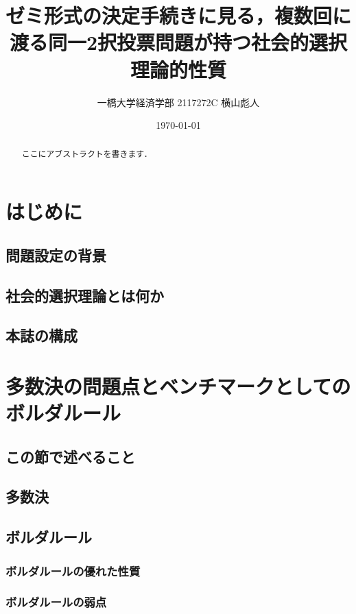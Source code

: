 \documentclass{jsarticle}
\begin{document}
\title{ゼミ形式の決定手続きに見る，複数回に渡る同一2択投票問題が持つ社会的選択理論的性質}
\author{一橋大学経済学部 2117272C 横山彪人}
\date{\today}
\maketitle

\begin{abstract}
  ここにアブストラクトを書きます．
\end{abstract}

\tableofcontents
\clearpage

\section{はじめに}
\subsection{問題設定の背景}
\subsection{社会的選択理論とは何か}
\subsection{本誌の構成}

\section{多数決の問題点とベンチマークとしてのボルダルール}
\subsection{この節で述べること}

\subsection{多数決}

\subsection{ボルダルール}
\subsubsection{ボルダルールの優れた性質}
\subsubsection{ボルダルールの弱点}
\end{document}
